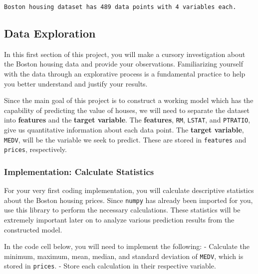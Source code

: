 \documentclass[11pt]{article}
\begin{document}
    \begin{Verbatim}[commandchars=\\\{\}]
Boston housing dataset has 489 data points with 4 variables each.

    \end{Verbatim}

    \subsection{Data Exploration}\label{data-exploration}

In this first section of this project, you will make a cursory
investigation about the Boston housing data and provide your
observations. Familiarizing yourself with the data through an
explorative process is a fundamental practice to help you better
understand and justify your results.

Since the main goal of this project is to construct a working model
which has the capability of predicting the value of houses, we will need
to separate the dataset into \textbf{features} and the \textbf{target
variable}. The \textbf{features},
\texttt{\textquotesingle{}RM\textquotesingle{}},
\texttt{\textquotesingle{}LSTAT\textquotesingle{}}, and
\texttt{\textquotesingle{}PTRATIO\textquotesingle{}}, give us
quantitative information about each data point. The \textbf{target
variable}, \texttt{\textquotesingle{}MEDV\textquotesingle{}}, will be
the variable we seek to predict. These are stored in \texttt{features}
and \texttt{prices}, respectively.

    \subsubsection{Implementation: Calculate
Statistics}\label{implementation-calculate-statistics}

For your very first coding implementation, you will calculate
descriptive statistics about the Boston housing prices. Since
\texttt{numpy} has already been imported for you, use this library to
perform the necessary calculations. These statistics will be extremely
important later on to analyze various prediction results from the
constructed model.

In the code cell below, you will need to implement the following: -
Calculate the minimum, maximum, mean, median, and standard deviation of
\texttt{\textquotesingle{}MEDV\textquotesingle{}}, which is stored in
\texttt{prices}. - Store each calculation in their respective variable.
\end{document}
